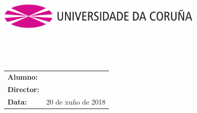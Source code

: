 %
%
\begin{titlepage}
	\begin{center}
		\includegraphics[width=10cm]{./images/03-simbolo-logo-cor-udc-2.png}
		\vspace{2cm}

		{\Large{\textbf{\centro}}}
		\\
		{\it \large{\textbf{\departamento}}}
		\vspace{1cm}

		{\large {\sc \proyecto}\\{\curso}}
		\vspace{1cm}

		\textbf{\Large \titulogalego}
		\vspace{6cm}
	\end{center}

	\begin{flushright}
		\begin{tabular}{ll}
			\large{\textbf{Alumno:}}	&
			\large{\autor} \\

			\large{\textbf{Director:}}	&
			\large{\director} \\


			\large{\textbf{Data:}}		&
			\large{20 de xuño de 2018} \\
		\end{tabular}
	\end{flushright}
\end{titlepage}
